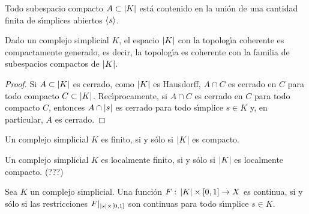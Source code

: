 \begin{coroCompactoContenidoEnFinitosSimplices}%
	\label{thm:compactocontenidoenfinitossimplices}
	Todo subespacio compacto $A\subset\left|K\right|$ est\'{a} contenido en
	la uni\'{o}n de una cantidad finita de s\'{\i}mplices
	abiertos $\langle s\rangle$.
\end{coroCompactoContenidoEnFinitosSimplices}

\begin{coroTodoComplejoEsCompactamenteGenerado}%
	\label{thm:todocomplejoescompactamentegenerado}
	Dado un complejo simplicial $K$, el espacio $\left|K\right|$ con
	la topolog\'{\i}a coherente es compactamente generado, es decir,
	la topolog\'{\i}a es coherente con la familia de subespacios
	compactos de $\left|K\right|$.
\end{coroTodoComplejoEsCompactamenteGenerado}

\begin{proof}
	Si $A\subset\left|K\right|$ es cerrado, como $\left|K\right|$ es Hausdorff,
	$A\cap C$ es cerrado en $C$ para todo compacto $C\subset\left|K\right|$.
	Rec\'{\i}procamente, si $A\cap C$ es cerrado en $C$ para todo
	compacto $C$, entonces $A\cap\left|s\right|$ es cerrado para todo
	s\'{\i}mplice $s\in K$ y, en particular, $A$ es cerrado.
\end{proof}

\begin{coroComplejoFinitoEspacioCompacto}%
	\label{thm:complejofinitoespaciocompacto}
	Un complejo simplicial $K$ es finito, si y s\'{o}lo si $\left|K\right|$
	es compacto.
\end{coroComplejoFinitoEspacioCompacto}

\begin{coroComplejoLocalmenteFinitoEspacioLocalmenteCompacto}%
	\label{thm:complejolocalmentefinitoespaciolocalmentecompacto}
	Un complejo simplicial $K$ es localmente finito, si y s\'{o}lo si
	$\left|K\right|$ es localmente compacto. (???)
\end{coroComplejoLocalmenteFinitoEspacioLocalmenteCompacto}

\begin{teoHomotopiasDeComplejos}\label{thm:homotopiasdecomplejos}
	Sea $K$ un complejo simplicial. Una funci\'{o}n
	$F:\,\left|K\right|\times [0,1]\rightarrow X$ es continua, si y s\'{o}lo si
	las restricciones $F|_{\left|s\right|\times [0,1]}$ son continuas
	para todo s\'{\i}mplice $s\in K$.
\end{teoHomotopiasDeComplejos}


